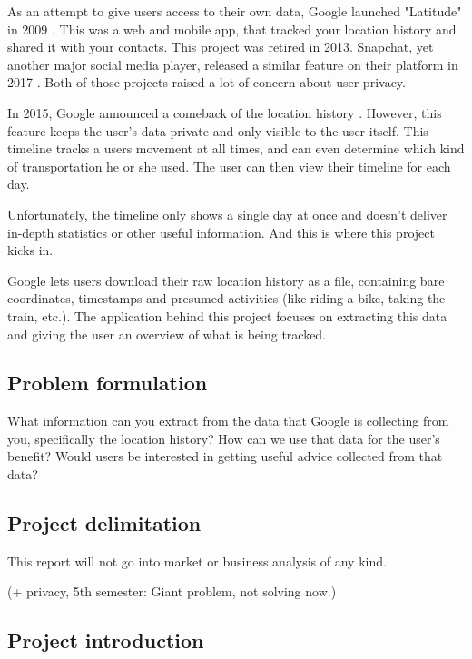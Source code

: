 \documentclass[12p]{article}
\begin{document}
		As an attempt to give users access to their own data, Google launched "Latitude" in 2009 \cite{GoogleLatitude}. This was a web and mobile app, that tracked your location history and shared it with your contacts. This project was retired in 2013. Snapchat, yet another major social media player, released a similar feature on their platform in 2017 \cite{SnapchatMap}. Both of those projects raised a lot of concern about user privacy.
		
		In 2015, Google announced a comeback of the location history \cite{TimelineAnnouncement}. However, this feature keeps the user's data private and only visible to the user itself. This timeline tracks a users movement at all times, and can even determine which kind of transportation he or she used. The user can then view their timeline for each day.
		
		Unfortunately, the timeline only shows a single day at once and doesn't deliver in-depth statistics or other useful information. And this is where this project kicks in. 
		
		Google lets users download their raw location history as a file, containing bare coordinates, timestamps and presumed activities (like riding a bike, taking the train, etc.). The application behind this project focuses on extracting this data and giving the user an overview of what is being tracked.
		
		\subsection{Problem formulation} \label{ProblemFormulation}
		
		What information can you extract from the data that Google is collecting from you, specifically the location history? How can we use that data for the user’s benefit? Would users be interested in getting useful advice collected from that data?
		
		
		\subsection{Project delimitation} \label{ProjectDelimitations}
		This report will not go into market or business analysis of any kind.
		
		(+ privacy, 5th semester: Giant problem, not solving now.)
		
		\subsection{Project introduction} \label{ProjectIntroduction}
		
\end{document}

